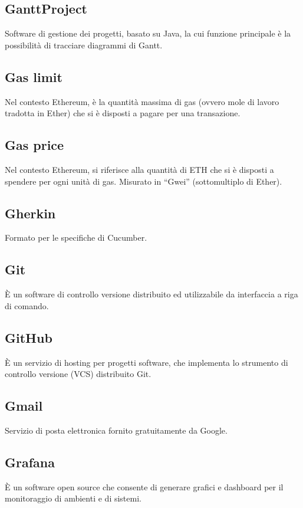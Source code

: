 	\subsection*{GanttProject}
	Software di gestione dei progetti, basato su Java, la cui funzione principale è la possibilità di tracciare diagrammi di Gantt.
	\subsection*{Gas limit}
	Nel contesto Ethereum, è la quantità massima di gas (ovvero mole di lavoro tradotta in Ether) che si è disposti a pagare per una transazione.
	\subsection*{Gas price}
	Nel contesto Ethereum, si riferisce alla quantità di ETH che si è disposti a spendere per ogni unità di gas. Misurato in “Gwei” (sottomultiplo di Ether).
	\subsection*{Gherkin}
	Formato per le specifiche di Cucumber.
	\subsection*{Git}
	È un software di controllo versione distribuito ed utilizzabile da interfaccia a riga di comando.
	\subsection*{GitHub}
	È un servizio di hosting per progetti software, che implementa lo strumento di controllo versione (VCS) distribuito Git.
	\subsection*{Gmail}
	Servizio di posta elettronica fornito gratuitamente da Google.
	\subsection*{Grafana}
	È un software open source che consente di generare grafici e dashboard per il monitoraggio di ambienti e di sistemi.
\pagebreak
\section[H]{}
